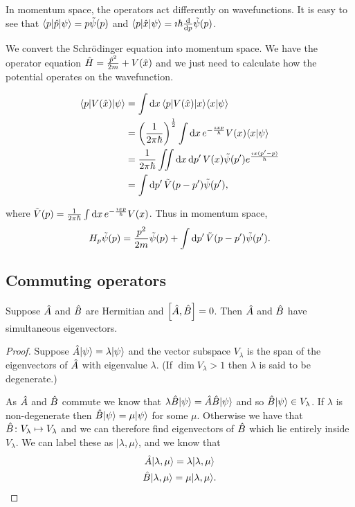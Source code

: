 \documentclass{notes}
\newcommand{\bra}[1]{\langle#1|}
\newcommand{\ket}[1]{|#1\rangle}
\newcommand{\scp}[2]{\langle#1|#2\rangle}
\newcommand{\com}[2]{\left[#1,#2\right]}
\begin{document}
In momentum space, the operators act differently on wavefunctions.  It
is easy to see that $\bra{p} \Hat{p} \ket{\psi} = p \Tilde{\psi}(p)$
and $\bra{p} \Hat{x} \ket{\psi} = \imath \hbar \diff{}{p} \Tilde{\psi}(p)$.

We convert the Schr\"odinger equation into momentum space.  We have
the operator equation $\Hat{H} = \frac{\Hat{p}^2}{2 m} + V(\Hat{x})$
and we just need to calculate how the potential operates on the
wavefunction.

\begin{align*}
\bra{p} V(\Hat{x}) \ket{\psi} &= \int \ud x\,
\bra{p} V(\Hat{x}) \ket{x} \scp{x}{\psi} \\
&= \left( \frac{1}{2 \pi \hbar} \right)^{\frac{1}{2}}
\int \ud x\, e^{- \frac{\imath x p}{\hbar}} V(x) \scp{x}{\psi} \\
&= \frac{1}{2 \pi \hbar} \iint \ud x\, \ud p'\, V(x) \Tilde{\psi}(p')
 e^{\frac{\imath x (p'-p) }{\hbar}} \\
&= \int \ud p'\, \Tilde{V}(p-p') \Tilde{\psi}(p'),
\end{align*}

where $\Tilde{V}(p) = \frac{1}{2 \pi \hbar}
\int \mathrm{d} x\, e^{- \frac{\imath x p}{\hbar}} V(x)$.  Thus in momentum
space,
\[
H_p \Tilde{\psi}(p) = \frac{p^2}{2 m} \Tilde{\psi}(p)
+ \int \mathrm{d} p'\, \Tilde{V}(p-p') \Tilde{\psi}(p').
\]

\subsection{Commuting operators}

Suppose $\Hat{A}$ and $\Hat{B}$ are Hermitian and $\com{\Hat{A}}{\Hat{B}}=0$.
Then $\Hat{A}$ and $\Hat{B}$ have simultaneous eigenvectors.

\begin{proof}
Suppose $\Hat{A} \ket{\psi} = \lambda \ket{\psi}$ and the vector
subspace $V_\lambda$ is the span of the eigenvectors of $\Hat{A}$ with
eigenvalue $\lambda$.  (If $\dim V_\lambda > 1$ then $\lambda$ is said to
be degenerate.)

As $\Hat{A}$ and $\Hat{B}$ commute we know that
$\lambda \Hat{B} \ket{\psi} = \Hat{A} \Hat{B} \ket{\psi}$ and so
$\Hat{B} \ket{\psi} \in V_\lambda$.  If $\lambda$ is non-degenerate
then $\Hat{B} \ket{\psi} = \mu \ket{\psi}$ for some $\mu$.  Otherwise
we have that $\Hat{B} \colon V_\lambda \mapsto V_\lambda$ and we can therefore
find eigenvectors of $\Hat{B}$ which lie entirely inside $V_\lambda$.  We
can label these as $\ket{\lambda,\mu}$, and we know that
\begin{gather*}
\Hat{A} \ket{\lambda,\mu} = \lambda \ket{\lambda,\mu}\\
\Hat{B} \ket{\lambda,\mu} = \mu \ket{\lambda,\mu}.
\end{gather*}
\end{proof}
\end{document}
